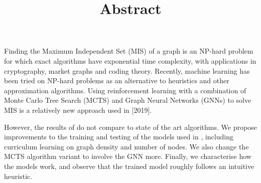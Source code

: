 \documentclass[12pt]{article}
\begin{document}
\title{Abstract}
\date{\vspace{-5ex}}
\maketitle

Finding the Maximum Independent Set (MIS) of a graph is an NP-hard problem for which exact algorithms have exponential time complexity, with applications in cryptography, market graphs and coding theory. Recently, machine learning has been tried on NP-hard problems as an alternative to heuristics and other approximation algorithms. Using reinforcement learning with a combination of Monte Carlo Tree Search (MCTS) and Graph Neural Networks (GNNs) to solve MIS is a relatively new approach used in \citeauthor{main} [2019]. 

However, the results of \citeauthor*{main} do not compare to state of the art algorithms. We propose improvements to the training and testing of the models used in \citeauthor*{main}, including curriculum learning on graph density and number of nodes. We also change the MCTS algorithm variant to involve the GNN more. Finally, we characterise how the models work, and observe that the trained model roughly follows an intuitive heuristic. 

\end{document}
